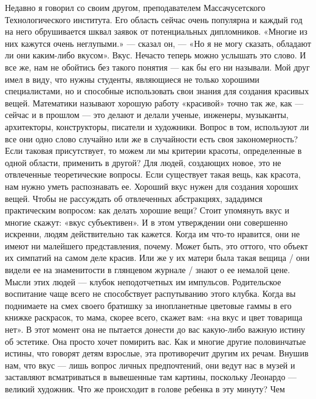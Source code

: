 \documentclass[ebook,12pt,oneside,openany]{memoir}
\begin{document}
\maketitle

Недавно я говорил со своим другом, преподавателем Массачусетского
Технологического института. Его область сейчас очень популярна и
каждый год на него обрушивается шквал заявок от потенциальных
дипломников. «Многие из них кажутся очень неглупыми.» — сказал он, —
«Но я не могу сказать, обладают ли они каким-либо вкусом». Вкус.
Нечасто теперь можно услышать это слово. И все же, нам не обойтись без
такого понятия — как бы его ни называли. Мой друг имел в виду, что
нужны студенты, являющиеся не только хорошими специалистами, но и
способные использовать свои знания для создания красивых вещей.
Математики называют хорошую работу «красивой» точно так же, как —
сейчас и в прошлом — это делают и делали ученые, инженеры, музыканты,
архитекторы, конструкторы, писатели и художники. Вопрос в том,
используют ли все они одно слово случайно или же в случайности есть
своя закономерность? Если таковая присутствует, то можем ли мы
критерии красоты, определенные в одной области, применить в другой?
Для людей, создающих новое, это не отвлеченные теоретические вопросы.
Если существует такая вещь, как красота, нам нужно уметь распознавать
ее. Хороший вкус нужен для создания хороших вещей. Чтобы не рассуждать
об отвлеченных абстракциях, зададимся практическим вопросом: как
делать хорошие вещи? Стоит упомянуть вкус и многие скажут: «вкус
субъективен». И в этом утверждении они совершенно искренни, людям
действительно так кажется. Когда им что-то нравится, они не имеют ни
малейшего представления, почему. Может быть, это оттого, что объект их
симпатий на самом деле красив. Или же у их матери была такая вещица /
они видели ее на знаменитости в глянцевом журнале / знают о ее немалой
цене. Мысли этих людей — клубок неподотчетных им импульсов.
Родительское воспитание чаще всего не способствует распутыванию этого
клубка. Когда вы поднимаете на смех своего братишку за инопланетные
цветовые гаммы в его книжке раскрасок, то мама, скорее всего, скажет
вам: «на вкус и цвет товарища нет». В этот момент она не пытается
донести до вас какую-либо важную истину об эстетике. Она просто хочет
помирить вас. Как и многие другие половинчатые истины, что говорят
детям взрослые, эта противоречит другим их речам. Внушив нам, что вкус
— лишь вопрос личных предпочтений, они ведут нас в музей и заставляют
всматриваться в вывешенные там картины, поскольку Леонардо — великий
художник. Что же происходит в голове ребенка в эту минуту? Чем
\end{document}
